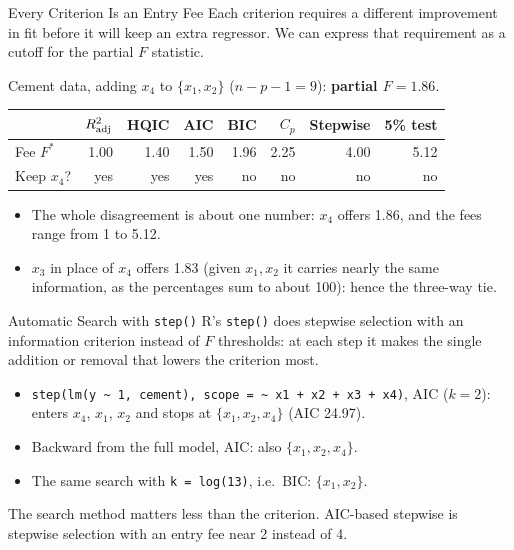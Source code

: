 \begin{frame}{Every Criterion Is an Entry Fee}
    \small
    Each criterion requires a different improvement in fit before it will keep an extra regressor. We can express that requirement as a cutoff for the partial $F$ statistic.


    Cement data, adding $x_4$ to $\{x_1,x_2\}$ ($n-p-1=9$): \textbf{partial $F=1.86$}.
    \begin{center}
        \footnotesize
        \begin{tabular}{lrrrrrrr}
            \toprule
            & $R^2_{\mathrm{adj}}$ & HQIC & AIC & BIC & $C_p$ & Stepwise & 5\% test \\
            \midrule
            Fee $F^*$ & 1.00 & 1.40 & 1.50 & 1.96 & 2.25 & 4.00 & 5.12 \\
            Keep $x_4$? & yes & yes & yes & no & no & no & no \\
            \bottomrule
        \end{tabular}
    \end{center}
    \begin{itemize}
        \item The whole disagreement is about one number: $x_4$ offers 1.86, and the fees range from 1 to 5.12.
        \item $x_3$ in place of $x_4$ offers 1.83 (given $x_1,x_2$ it carries nearly the same information, as the percentages sum to about 100): hence the three-way tie.
    \end{itemize}
\end{frame}


\begin{frame}{Automatic Search with \texttt{step()}}
    R's \texttt{step()} does stepwise selection with an information criterion instead of $F$ thresholds: at each step it makes the single addition or removal that lowers the criterion most.
    \svspace{0.3em}
    \begin{itemize}
        \item \texttt{step(lm(y \textasciitilde{} 1, cement), scope = \textasciitilde{} x1 + x2 + x3 + x4)}, AIC ($k=2$): enters $x_4$, $x_1$, $x_2$ and stops at $\{x_1,x_2,x_4\}$ (AIC 24.97).
        \item Backward from the full model, AIC: also $\{x_1,x_2,x_4\}$.
        \item The same search with \texttt{k = log(13)}, i.e.\ BIC: $\{x_1,x_2\}$.
    \end{itemize}
    \svspace{0.3em}
    The search method matters less than the criterion. AIC-based stepwise is stepwise selection with an entry fee near 2 instead of 4.
\end{frame}


